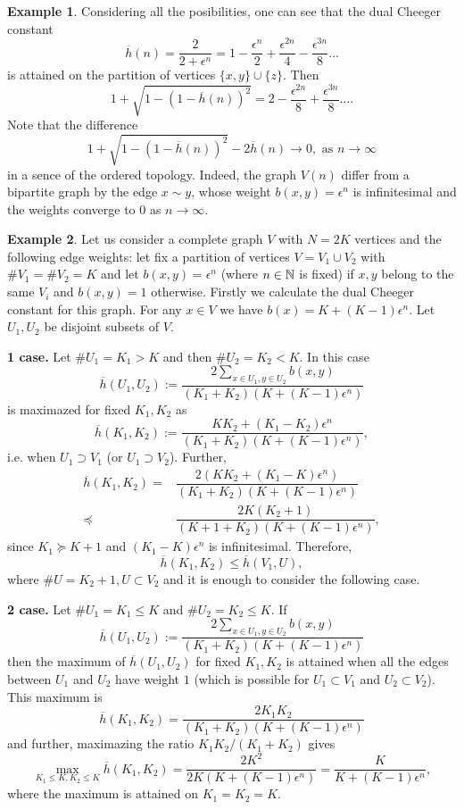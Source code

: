 \documentclass[a4paper,12pt]{amsart}
\theoremstyle{definition}
\newtheorem{example}{Example}
\begin{document}
\begin{example}
Considering all the posibilities, one can see that the dual Cheeger constant
$$
\overline h(n)=\dfrac{2}{2+\epsilon^n}=1-\dfrac{\epsilon^n}{2}+\dfrac{\epsilon^{2n}}{4}-\dfrac{\epsilon^{3n}}{8}\dots
$$
is attained on the partition of vertices $\{x,y\}\cup\{z\}$.
Then 
$$
1+\sqrt{1-(1-\overline h(n))^2}=2-\dfrac{\epsilon^{2n}}{8}+\dfrac{\epsilon^{3n}}{8}\dots.
$$
Note that the difference 
$$
1+\sqrt{1-(1-\overline h(n))^2}-2\overline h(n)\to 0, \mbox{ as }n\to\infty
$$
in a sence of the ordered topology. Indeed, the graph $V(n)$ differ from a bipartite graph by the edge $x\sim y$, whose weight $b(x,y)=\epsilon^n$  is infinitesimal and the weights converge to $0$ as $n\to\infty$.
\end{example}
\begin{example}
Let us consider a complete graph $V$ with $N=2K$ vertices and the following edge weights: let fix a partition of vertices $V=V_1\cup V_2$ with $\#V_1=\#V_2=K$ and let $b(x,y)=\epsilon^n$ (where  $n\in \Bbb N$ is fixed) if $x,y$ belong to the same $V_i$ and $b(x,y)=1$ otherwise. Firstly we calculate the dual Cheeger constant for this graph. For any $x\in V$ we have $b(x)={K+(K-1)\epsilon^n}$. Let $U_1, U_2$ be disjoint subsets of $V$.

\textbf{1 case.} Let $\#U_1=K_1> K$ and then $\#U_2=K_2< K$. In this case
$$
\overline h(U_1,U_2):=\dfrac{2\sum_{x\in U_1,y\in U_2}b(x,y)}{(K_1+K_2)(K+(K-1)\epsilon^n)}
$$
is maximazed for fixed $K_1, K_2$ as
$$
\overline h(K_1,K_2):=\dfrac{K K_2+(K_1-K_2)\epsilon^n}{(K_1+K_2)(K+(K-1)\epsilon^n)},
$$
i.e. when $U_1\supset V_1$ (or $U_1\supset V_2$). Further,
\begin{align}
\overline h(K_1,K_2)=&\dfrac{2(K K_2+(K_1-K)\epsilon^n)}{(K_1+K_2)(K+(K-1)\epsilon^n)}\\
\preceq& \dfrac{2K (K_2+1)}{(K+1+K_2)(K+(K-1)\epsilon^n)},
\end{align}
since $K_1\succeq K+1$ and $(K_1-K)\epsilon^n$ is infinitesimal. Therefore,
$$
\overline h(K_1,K_2)\le \overline h(V_1,U),
$$
where $\#U=K_2+1, U\subset V_2$ and it is enough to consider the following case.

\textbf{2 case.} Let $\#U_1=K_1\leq K$ and $\#U_2=K_2\leq K$. If
$$
\overline h(U_1,U_2):=\dfrac{2\sum_{x\in U_1,y\in U_2}b(x,y)}{(K_1+K_2)(K+(K-1)\epsilon^n)}
$$
then the maximum of $\overline h(U_1,U_2)$ for fixed $K_1,K_2$ is attained when all the edges between $U_1$ and $U_2$ have weight $1$ (which is possible for $U_1\subset V_1$ and $U_2\subset V_2$). This maximum is
$$
\overline h(K_1,K_2)=\dfrac{2K_1 K_2}{(K_1+K_2)(K+(K-1)\epsilon^n)}
$$
and further, maximazing the ratio ${K_1 K_2}/(K_1+K_2)$ gives
$$
\max_{K_1\leq K, K_2\leq K}\overline h(K_1,K_2)=\dfrac{2 K^2}{2K(K+(K-1)\epsilon^n)}=\dfrac{K}{K+(K-1)\epsilon^n},
$$
where the maximum is attained on $K_1=K_2=K$. 


\end{example}
\end{document}
